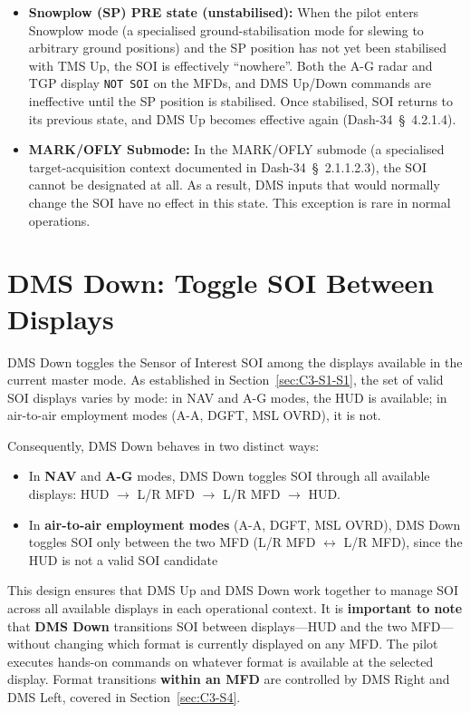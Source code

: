 \documentclass[11pt, a4paper, twoside]{report}
\providecommand{\dashref}[1]{Dash-34~\S~#1}
\begin{document}
\begin{itemize}
	\item \textbf{Snowplow (SP) PRE state (unstabilised):} When the pilot enters Snowplow mode (a specialised ground-stabilisation mode for slewing to arbitrary ground positions) and the SP position has not yet been stabilised with TMS Up, the SOI is effectively ``nowhere''. Both the A-G radar and TGP display \texttt{NOT SOI} on the MFDs, and DMS Up/Down commands are ineffective until the SP position is stabilised. Once stabilised, SOI returns to its previous state, and DMS Up becomes effective again (\dashref{4.2.1.4}).
	\item \textbf{MARK/OFLY Submode:} In the MARK/OFLY submode (a specialised target-acquisition context documented in \dashref{2.1.1.2.3}), the SOI cannot be designated at all. As a result, DMS inputs that would normally change the SOI have no effect in this state. This exception is rare in normal operations.
\end{itemize}

\section{DMS Down: Toggle SOI Between Displays}
\label{sec:C3-S3}

DMS Down toggles the Sensor of Interest SOI among the displays available in the current master mode. As established in Section~\ref{sec:C3-S1-S1}, the set of valid SOI displays varies by mode: in NAV and A-G modes, the HUD is available; in air-to-air employment modes (A-A, DGFT, MSL OVRD), it is not.

Consequently, DMS Down behaves in two distinct ways:

\begin{itemize}
	\item In \textbf{NAV} and \textbf{A-G} modes, DMS Down toggles SOI through all available displays: HUD $\rightarrow$ L/R MFD $\rightarrow$ L/R MFD $\rightarrow$ HUD.
	\item In \textbf{air-to-air employment modes} (A-A, DGFT, MSL OVRD), DMS Down toggles SOI only between the two MFD (L/R MFD $\leftrightarrow$ L/R MFD), since the HUD is not a valid SOI candidate
\end{itemize}

This design ensures that DMS Up and DMS Down work together to manage SOI across all available displays in each operational context. It is \textbf{important to note} that \textbf{DMS Down} transitions SOI between displays—HUD and the two MFD—without changing which format is currently displayed on any MFD. The pilot executes hands-on commands on whatever format is available at the selected display. Format transitions \textbf{within an MFD} are controlled by DMS Right and DMS Left, covered in Section~\ref{sec:C3-S4}.
\end{document}
